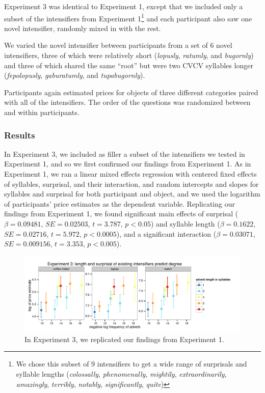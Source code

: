 \documentclass[a4paper,10pt]{article}
\newcommand{\w}[1]{\emph{#1}}
\begin{document}
      Experiment 3 was identical to Experiment 1, except that we included only a subset of the intensifiers from Experiment 1\footnote{We chose this subset of 9 intensifiers to get a wide range of surprisals and syllable lengths (\w{colossally}, \w{phenomenally}, \w{mightily}, \w{extraordinarily}, \w{amazingly}, \w{terribly}, \w{notably}, \w{significantly}, \w{quite})} and each participant also saw one novel intensifier, randomly mixed in with the rest.

      We varied the novel intensifier between participants from a set of 6 novel intensifiers, three of which were relatively short (\w{lopusly}, \w{ratumly}, and \w{bugornly}) and three of which shared the same ``root'' but were two CVCV syllables longer (\w{fepolopusly}, \w{gaburatumly}, and \w{tupabugornly}).

      Participants again estimated prices for objects of three different categories paired with all of the intensifiers. The order of the questions was randomized between and within participants.

    \subsubsection{Results}
      In Experiment 3, we included as filler a subset of the intensifiers we tested in Experiment 1, and so we first confirmed our findings from Experiment 1. As in Experiment 1, we ran a linear mixed effects regression with centered fixed effects of syllables, surprisal, and their interaction, and random intercepts and slopes for syllables and surprisal for both participant and object, and we used the logarithm of participants' price estimates as the dependent variable. Replicating our findings from Experiment 1, we found significant main effects of surprisal ($\beta=0.09481$, $SE=0.02503$, $t=3.787$, $p<0.05$) and syllable length ($\beta=0.1622$, $SE=0.02716$, $t=5.972$, $p<0.0005$), and a significant interaction ($\beta=0.03071$, $SE=0.009156$, $t=3.353$, $p<0.005$).

      \begin{figure}[ht]
      \begin{center}
      \includegraphics[width=\textwidth]{exp3_replication.pdf}
      \end{center}
      \caption{In Experiment 3, we replicated our findings from Experiment 1.} 
      \label{exp3_replication}
      \end{figure}
\end{document}
